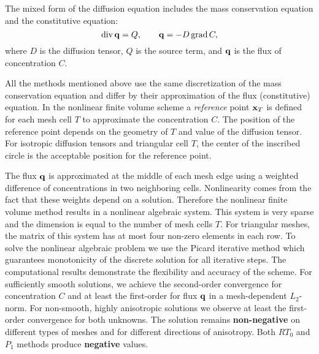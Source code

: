 \documentclass{report}
\begin{document}
The mixed form of the diffusion equation includes the mass conservation equation
and the constitutive equation:
\begin{equation}
{\rm div} \, {\bf q} = Q, \qquad {\bf q} = - D\, {\rm grad}\, C,
\nonumber
\end{equation}
where $ D$ is the diffusion tensor, $Q$ is the source term, and $\bf q$ is the
flux of concentration $C$.


All the methods mentioned above use the same discretization of the mass
conservation equation
and differ by their approximation of the flux (constitutive) equation.
In the nonlinear finite volume scheme a {\it reference} point ${\bf x}_T$ is defined for
each mesh cell $T$ to approximate the concentration $C$. The position of
the reference point
depends on the geometry of $T$ and value of the diffusion tensor.
For isotropic diffusion tensors and triangular cell $T$, the center of
the inscribed circle
is the acceptable position for the reference point.

The flux $\bf q$ is approximated at the middle of each mesh
edge using a weighted difference of concentrations in two neighboring
cells. Nonlinearity comes from the fact that these weights
depend on a solution. Therefore the nonlinear finite volume method
results in a nonlinear algebraic system.
This system is very sparse and the dimension is equal to the number of mesh cells $T$.
For triangular meshes, the matrix of this system has at most four
non-zero elements in each row.
To solve the nonlinear algebraic problem we use the Picard iterative
method which guarantees monotonicity of the
discrete solution for all iterative steps.
The computational results demonstrate the flexibility and accuracy of the scheme.
For sufficiently smooth solutions, we achieve the
second-order convergence for concentration $C$ and at least the first-order for flux
${\bf q}$ in a mesh-dependent $L_2$-norm. For non-smooth, highly anisotropic solutions
we observe at least the first-order convergence for both unknowns.
The solution remains {\bf non-negative} on different types of meshes and for different
directions of anisotropy.
Both $RT_0$ and $P_1$ methods produce {\bf negative} values.
\end{document}
